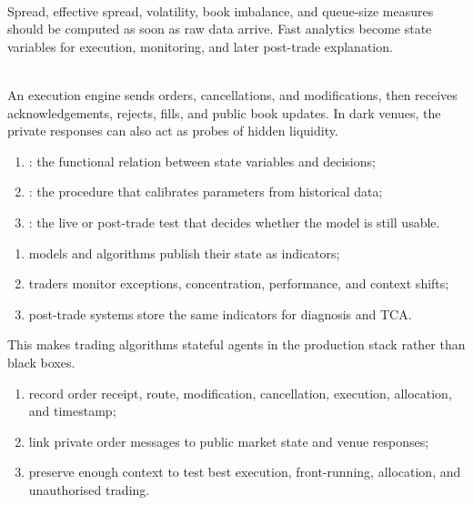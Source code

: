 \begin{mechanism} \\
Spread, effective spread, volatility, book imbalance, and queue-size measures should be computed as soon as raw data arrive. Fast analytics become state variables for execution, monitoring, and later post-trade explanation.
\end{mechanism}

\begin{caveat} \\
An execution engine sends orders, cancellations, and modifications, then receives acknowledgements, rejects, fills, and public book updates. In dark venues, the private responses can also act as probes of hidden liquidity.
\end{caveat}

\begin{taxonomy} 
\begin{enumerate}[label=\roman*.]
\setlength{\itemsep}{0pt}
\item {}: the functional relation between state variables and decisions;
\item {}: the procedure that calibrates parameters from historical data;
\item {}: the live or post-trade test that decides whether the model is still usable.
\end{enumerate}
\end{taxonomy}

\begin{process} 
\begin{enumerate}[label=\roman*.]
\setlength{\itemsep}{0pt}
\item models and algorithms publish their state as indicators;
\item traders monitor exceptions, concentration, performance, and context shifts;
\item post-trade systems store the same indicators for diagnosis and TCA.
\end{enumerate}
This makes trading algorithms stateful agents in the production stack rather than black boxes.
\end{process}

\begin{process} 
\begin{enumerate}[label=\roman*.]
\setlength{\itemsep}{0pt}
\item record order receipt, route, modification, cancellation, execution, allocation, and timestamp;
\item link private order messages to public market state and venue responses;
\item preserve enough context to test best execution, front-running, allocation, and unauthorised trading.
\end{enumerate}
\end{process}

